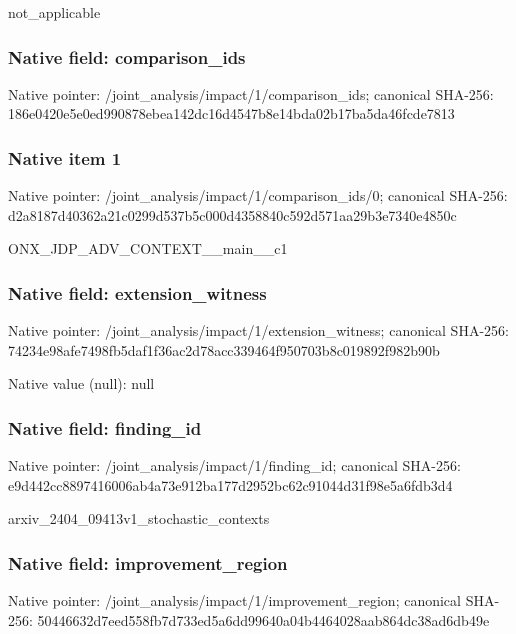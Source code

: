 \documentclass[10pt,a4paper]{article}
\begin{document}
\begingroup\raggedright\sloppy not\_\allowbreak{}applicable\par\endgroup

\subsubsection{Native field: comparison\_\allowbreak{}ids}
Native pointer: /joint\_\allowbreak{}analysis/impact/1/comparison\_\allowbreak{}ids; canonical SHA-256: 186e0420e5e0ed990878ebea142dc16d4547b8e14bda02b17ba5da46fcde7813

\subsubsection{Native item 1}
Native pointer: /joint\_\allowbreak{}analysis/impact/1/comparison\_\allowbreak{}ids/0; canonical SHA-256: d2a8187d40362a21c0299d537b5c000d4358840c592d571aa29b3e7340e4850c

\begingroup\raggedright\sloppy ONX\_\allowbreak{}JDP\_\allowbreak{}ADV\_\allowbreak{}CONTEXT\_\allowbreak{}\_\allowbreak{}main\_\allowbreak{}\_\allowbreak{}c1\par\endgroup

\subsubsection{Native field: extension\_\allowbreak{}witness}
Native pointer: /joint\_\allowbreak{}analysis/impact/1/extension\_\allowbreak{}witness; canonical SHA-256: 74234e98afe7498fb5daf1f36ac2d78acc339464f950703b8c019892f982b90b

Native value (null): null

\subsubsection{Native field: finding\_\allowbreak{}id}
Native pointer: /joint\_\allowbreak{}analysis/impact/1/finding\_\allowbreak{}id; canonical SHA-256: e9d442cc8897416006ab4a73e912ba177d2952bc62c91044d31f98e5a6fdb3d4

\begingroup\raggedright\sloppy arxiv\_\allowbreak{}2404\_\allowbreak{}09413v1\_\allowbreak{}stochastic\_\allowbreak{}contexts\par\endgroup

\subsubsection{Native field: improvement\_\allowbreak{}region}
Native pointer: /joint\_\allowbreak{}analysis/impact/1/improvement\_\allowbreak{}region; canonical SHA-256: 50446632d7eed558fb7d733ed5a6dd99640a04b4464028aab864dc38ad6db49e
\end{document}
